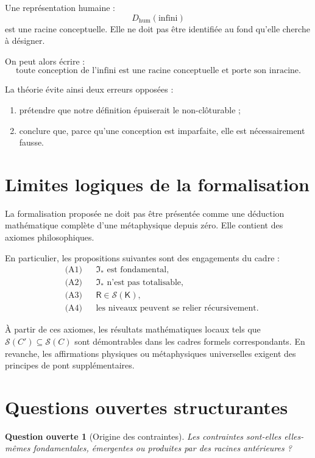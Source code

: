 \documentclass[11pt,a4paper]{article}
\newtheorem{question}{Question ouverte}[section]
\newcommand{\Rac}{\mathsf{R}}
\newcommand{\Cadre}{\mathsf{K}}
\newcommand{\Sol}{\mathcal{S}}
\begin{document}
Une représentation humaine :
\[
D_{\mathrm{hum}}(\text{infini})
\]
est une racine conceptuelle. Elle ne doit pas être identifiée au fond qu'elle
cherche à désigner.

On peut alors écrire :
\[
\boxed{
\text{toute conception de l'infini est une racine conceptuelle et porte son inracine.}
}
\]

La théorie évite ainsi deux erreurs opposées :
\begin{enumerate}
    \item prétendre que notre définition épuiserait le non-clôturable ;
    \item conclure que, parce qu'une conception est imparfaite, elle est nécessairement fausse.
\end{enumerate}

\section{Limites logiques de la formalisation}

La formalisation proposée ne doit pas être présentée comme une déduction
mathématique complète d'une métaphysique depuis zéro. Elle contient des axiomes
philosophiques.

En particulier, les propositions suivantes sont des engagements du cadre :
\[
\begin{aligned}
&\text{(A1)}&&\mathfrak I_\ast\text{ est fondamental},\\
&\text{(A2)}&&\mathfrak I_\ast\text{ n'est pas totalisable},\\
&\text{(A3)}&&\Rac\in\Sol(\Cadre),\\
&\text{(A4)}&&\text{les niveaux peuvent se relier récursivement}.
\end{aligned}
\]

À partir de ces axiomes, les résultats mathématiques locaux tels que
\(\Sol(C')\subseteq\Sol(C)\) sont démontrables dans les cadres formels
correspondants. En revanche, les affirmations physiques ou métaphysiques
universelles exigent des principes de pont supplémentaires.

\section{Questions ouvertes structurantes}

\begin{question}[Origine des contraintes]
Les contraintes sont-elles elles-mêmes fondamentales, émergentes ou produites
par des racines antérieures ?
\end{question}
\end{document}
